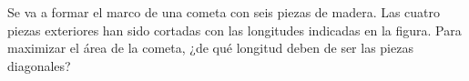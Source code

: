 \item Se va a formar el marco de una cometa con seis piezas de madera. Las cuatro piezas exteriores han sido cortadas con las longitudes indicadas en la figura. Para maximizar el área de la cometa, ¿de qué longitud deben de ser las piezas diagonales?
\begin{center}
\end{center}
